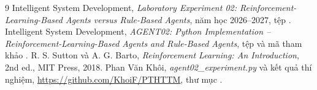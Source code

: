 \documentclass[12pt,a4paper]{report}
\begin{document}
\clearpage
\begin{thebibliography}{9}
 Intelligent System Development, \emph{Laboratory Experiment 02:
Reinforcement-Learning-Based Agents versus Rule-Based Agents}, năm học 2026--2027,
tệp .
 Intelligent System Development, \emph{AGENT02: Python
Implementation -- Reinforcement-Learning-Based Agents and Rule-Based Agents},
tệp  và mã tham khảo
.
 R. S. Sutton và A. G. Barto, \emph{Reinforcement Learning: An
Introduction}, 2nd ed., MIT Press, 2018.
 Phan Văn Khôi, \emph{agent02\_experiment.py} và kết quả thí nghiệm,
\url{https://github.com/KhoiF/PTHTTM}, thư mục .
\end{thebibliography}
\end{document}
